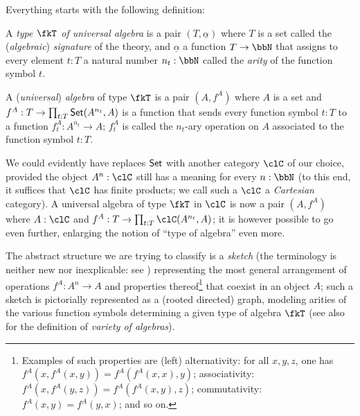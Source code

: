Everything starts with the following definition:
\begin{definition}\label{unialg}
	A \emph{type $\fkT$ of universal algebra} is a pair $(T,\underline{\alpha})$ where $T$ is a set called the (\emph{algebraic}) \emph{signature} of the theory, and $\underline\alpha$ a function $T \to \bbN$ that assigns to every element $t: T$ a natural number $n_t: \bbN$ called the \emph{arity} of the function symbol $t$.
\end{definition}
\begin{definition}
	A (\emph{universal}) \emph{algebra} of type $\fkT$ is a pair $(A,f^A)$ where $A$ is a set and $f^A: T \to \prod_{t: T} \mathsf{Set}(A^{n_t},A )$ is a function that sends every function symbol $t: T$ to a function $f^A_t: A^{n_t} \to A$; $f^A_t$ is called the $n_t$-ary operation on $A$ associated to the function symbol $t: T$.
\end{definition}
We could evidently have replaces $\mathsf{Set}$ with another category $\clC$ of our choice, provided the object $A^n: \clC$ still has a meaning for every $n: \bbN$ (to this end, it suffices that $\clC$ has finite products; we call such a $\clC$ a \emph{Cartesian} category). A universal algebra of type $\fkT$ in $\clC$ is now a pair $(A,f^A)$ where $A: \clC$ and $f^A: T \to \prod_{t: T} \clC(A^{n_t},A )$; it is however possible to go even further, enlarging the notion of ``type of algebra'' even more.

The abstract structure we are trying to classify is a \emph{sketch} (the terminology is neither new nor inexplicable: see \cite{ehresmann1968esquisses,coppey1984leccons, Bor2}) representing the most general arrangement of operations $f^A: A^n \to A$ and properties thereof\footnote{Examples of such properties are (left) alternativity: for all $x,y,z$, one has $f^A(x,f^A(x,y)) = f^A(f^A(x,x),y)$; associativity: $f^A(x,f^A(y,z)) = f^A(f^A(x,y),z)$; commutativity: $f^A(x,y)=f^A(y,x)$; and so on.} that coexist in an object $A$; such a sketch is pictorially represented as a (rooted directed) graph, modeling arities of the various function symbols determining a given type of algebra $\fkT$ (see also \cite[XV.3]{grillet2007abstract} for the definition of \emph{variety of algebras}).%

